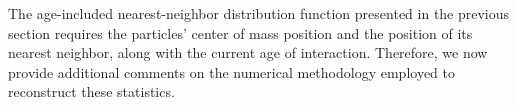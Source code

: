 
The age-included nearest-neighbor distribution function presented in the previous section requires the particles' center of mass position and the position of its nearest neighbor, along with the current age of interaction.
Therefore, we now provide additional comments on the numerical methodology employed to reconstruct these statistics. 


